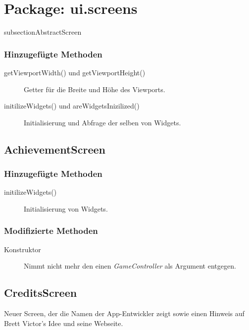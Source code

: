 \section{Package: ui.screens}

subsection{AbstractScreen}

\subsubsection{Hinzugefügte Methoden}
\begin{description}
\item[getViewportWidth() und getViewportHeight()]
Getter für die Breite und Höhe des Viewports.

\item[initilizeWidgets() und areWidgetsInizilized()]
Initialisierung und Abfrage der selben von Widgets.

\end{description}


\subsection{AchievementScreen}

\subsubsection{Hinzugefügte Methoden}
\begin{description}
\item[initilizeWidgets()]
Initialisierung von Widgets.

\end{description}

\subsubsection{Modifizierte Methoden}
\begin{description}
\item[Konstruktor]
Nimmt nicht mehr den einen \emph{GameController} als Argument entgegen.

\end{description}



\subsection{CreditsScreen}
Neuer Screen, der die Namen der App-Entwickler zeigt sowie einen Hinweis auf Brett Victor's Idee und seine Webseite.

